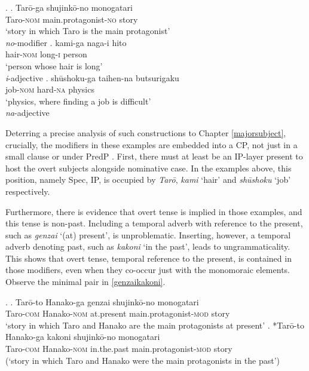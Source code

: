 \documentclass [output=book,colorlinks,citecolor=brown]{langscibook}
\begin{document}
\ex. \ag. Tarō-ga shujinkō-no monogatari\\
Taro-\textsc{nom} main.protagonist-\textsc{no} story\\
`story in which Taro is the main protagonist' \\ \null \hfill \textit{no}-modifier \citep[66]{watanabe:2010:notes}
\bg. kami-ga naga-i hito\\
hair-\textsc{nom} long-\textsc{i} person\\
`person whose hair is long' \\ \null \hfill \textit{i}-adjective \citep[1278]{miyagawa:2011:genitive}
\cg. shūshoku-ga taihen-na butsurigaku\\
job-\textsc{nom} hard-\textsc{na} physics\\
`physics, where finding a job is difficult' \\ \null \hfill \textit{na}-adjective \citep[255]{kuno:1973:structure}

Deterring a precise analysis of such constructions to Chapter \ref{majorsubject}, crucially, the modifiers in these examples are embedded into a CP, not just in a small clause or under PredP \citep{bowers:1993:predication}. First, there must at least be an IP-layer present to host the overt subjects alongside nominative case. In the examples above, this position, namely Spec, IP, is occupied by \textit{Tarō}, \textit{kami} `hair’ and \textit{shūshoku} `job’ respectively.

Furthermore, there is evidence that overt tense is implied in those examples, and this tense is non-past. Including a temporal adverb with reference to the present, such as \textit{genzai} `(at) present’, is unproblematic. Inserting, however, a temporal adverb denoting past, such as \textit{kakoni} `in the past’, leads to ungrammaticality. This shows that overt tense, temporal reference to the present, is contained in those modifiers, even when they co-occur just with the monomoraic elements. Observe the minimal pair in \ref{genzaikakoni}.


\ex. \label{genzaikakoni} \ag. Tarō-to Hanako-ga genzai shujinkō-no monogatari\\
Taro-\textsc{com} Hanako-\textsc{nom} at.present main.protagonist-\textsc{mod} story\\
`story in which Taro and Hanako are the main protagonists at present’
 \bg. *Tarō-to Hanako-ga kakoni shujinkō-no monogatari\\
Taro-\textsc{com} Hanako-\textsc{nom} in.the.past main.protagonist-\textsc{mod} story\\
(`story in which Taro and Hanako were the main protagonists in the past’)
\end{document}
